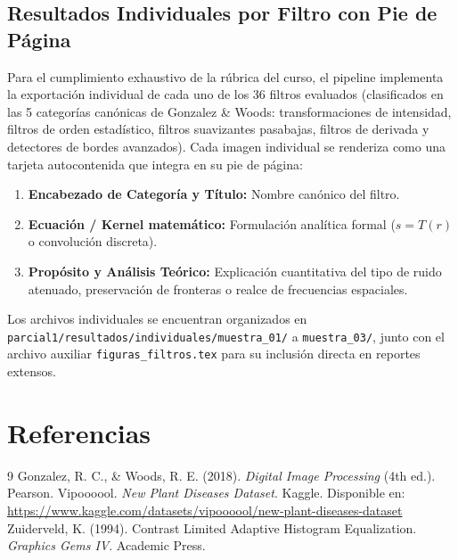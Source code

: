 \documentclass[11pt,a4paper]{article}
\begin{document}
\subsection{Resultados Individuales por Filtro con Pie de Página}
Para el cumplimiento exhaustivo de la rúbrica del curso, el pipeline implementa la exportación individual de cada uno de los 36 filtros evaluados (clasificados en las 5 categorías canónicas de Gonzalez \& Woods: transformaciones de intensidad, filtros de orden estadístico, filtros suavizantes pasabajas, filtros de derivada y detectores de bordes avanzados). Cada imagen individual se renderiza como una tarjeta autocontenida que integra en su pie de página:
\begin{enumerate}
    \item \textbf{Encabezado de Categoría y Título:} Nombre canónico del filtro.
    \item \textbf{Ecuación / Kernel matemático:} Formulación analítica formal ($s = T(r)$ o convolución discreta).
    \item \textbf{Propósito y Análisis Teórico:} Explicación cuantitativa del tipo de ruido atenuado, preservación de fronteras o realce de frecuencias espaciales.
\end{enumerate}
Los archivos individuales se encuentran organizados en \texttt{parcial1/resultados/individuales/muestra\_01/} a \texttt{muestra\_03/}, junto con el archivo auxiliar \texttt{figuras\_filtros.tex} para su inclusión directa en reportes extensos.

\section{Referencias}
\begin{thebibliography}{9}
Gonzalez, R. C., \& Woods, R. E. (2018). \textit{Digital Image Processing} (4th ed.). Pearson.
Vipoooool. \textit{New Plant Diseases Dataset}. Kaggle. Disponible en: \url{https://www.kaggle.com/datasets/vipoooool/new-plant-diseases-dataset}
Zuiderveld, K. (1994). Contrast Limited Adaptive Histogram Equalization. \textit{Graphics Gems IV}. Academic Press.
\end{thebibliography}
\end{document}
